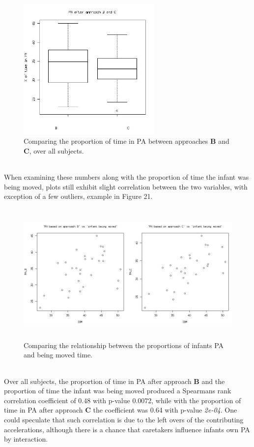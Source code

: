 \documentclass{article}
\begin{document}
{\begin{figure}[h]
\includegraphics[width=7cm, height=7cm]{boxplotPABC.jpg}
\caption{Comparing the proportion of time in PA between approaches \textbf{B} and \textbf{C}, over all subjects.}
\end{figure}
\\
 When examining these numbers along with the proportion of time the infant was being moved, plots still exhibit slight correlation between the two variables, with exception of a few outliers, example in Figure 21. 
\begin{figure}[h]
\includegraphics[width=14cm, height=7cm]{corrPABPACIBM.png}
\caption{Comparing the relationship between the proportions of infants PA and being moved time.}
\end{figure}
\\
Over all subjects, the proportion of time in PA after approach \textbf{B} and the proportion of time the infant was being moved produced a Spearmans rank correlation coefficient of 0.48 with p-value 0.0072, while with the proportion of time in PA after approach \textbf{C} the coefficient was 0.64 with p-value \textit{2e-04}. One could speculate that such correlation is due to the left overs of the contributing accelerations, although there is a chance that caretakers influence infants own PA by interaction.
}
\end{document}
